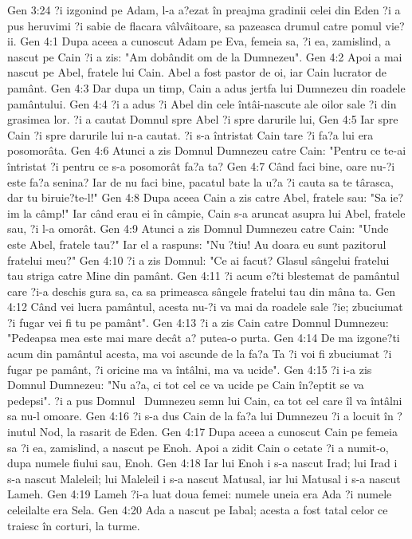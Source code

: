 Gen 3:24  ?i izgonind pe Adam, l-a a?ezat în preajma gradinii celei din Eden ?i a pus heruvimi ?i sabie de flacara vâlvâitoare, sa pazeasca drumul catre pomul vie?ii.
Gen 4:1  Dupa aceea a cunoscut Adam pe Eva, femeia sa, ?i ea, zamislind, a nascut pe Cain ?i a zis: "Am dobândit om de la Dumnezeu".
Gen 4:2  Apoi a mai nascut pe Abel, fratele lui Cain. Abel a fost pastor de oi, iar Cain lucrator de pamânt.
Gen 4:3  Dar dupa un timp, Cain a adus jertfa lui Dumnezeu din roadele pamântului.
Gen 4:4  ?i a adus ?i Abel din cele întâi-nascute ale oilor sale ?i din grasimea lor. ?i a cautat Domnul spre Abel ?i spre darurile lui,
Gen 4:5  Iar spre Cain ?i spre darurile lui n-a cautat. ?i s-a întristat Cain tare ?i fa?a lui era posomorâta.
Gen 4:6  Atunci a zis Domnul Dumnezeu catre Cain: "Pentru ce te-ai întristat ?i pentru ce s-a posomorât fa?a ta?
Gen 4:7  Când faci bine, oare nu-?i este fa?a senina? Iar de nu faci bine, pacatul bate la u?a ?i cauta sa te târasca, dar tu biruie?te-l!"
Gen 4:8  Dupa aceea Cain a zis catre Abel, fratele sau: "Sa ie?im la câmp!" Iar când erau ei în câmpie, Cain s-a aruncat asupra lui Abel, fratele sau, ?i l-a omorât.
Gen 4:9  Atunci a zis Domnul Dumnezeu catre Cain: "Unde este Abel, fratele tau?" Iar el a raspuns: "Nu ?tiu! Au doara eu sunt pazitorul fratelui meu?"
Gen 4:10  ?i a zis Domnul: "Ce ai facut? Glasul sângelui fratelui tau striga catre Mine din pamânt.
Gen 4:11  ?i acum e?ti blestemat de pamântul care ?i-a deschis gura sa, ca sa primeasca sângele fratelui tau din mâna ta.
Gen 4:12  Când vei lucra pamântul, acesta nu-?i va mai da roadele sale ?ie; zbuciumat ?i fugar vei fi tu pe pamânt".
Gen 4:13  ?i a zis Cain catre Domnul Dumnezeu: "Pedeapsa mea este mai mare decât a? putea-o purta.
Gen 4:14  De ma izgone?ti acum din pamântul acesta, ma voi ascunde de la fa?a Ta ?i voi fi zbuciumat ?i fugar pe pamânt, ?i oricine ma va întâlni, ma va ucide".
Gen 4:15  ?i i-a zis Domnul Dumnezeu: "Nu a?a, ci tot cel ce va ucide pe Cain în?eptit se va pedepsi". ?i a pus Domnul  Dumnezeu semn lui Cain, ca tot cel care îl va întâlni sa nu-l omoare.
Gen 4:16  ?i s-a dus Cain de la fa?a lui Dumnezeu ?i a locuit în ?inutul Nod, la rasarit de Eden.
Gen 4:17  Dupa aceea a cunoscut Cain pe femeia sa ?i ea, zamislind, a nascut pe Enoh. Apoi a zidit Cain o cetate ?i a numit-o, dupa numele fiului sau, Enoh.
Gen 4:18  Iar lui Enoh i s-a nascut Irad; lui Irad i s-a nascut Maleleil; lui Maleleil i s-a nascut Matusal, iar lui Matusal i s-a nascut Lameh.
Gen 4:19  Lameh ?i-a luat doua femei: numele uneia era Ada ?i numele celeilalte era Sela.
Gen 4:20  Ada a nascut pe Iabal; acesta a fost tatal celor ce traiesc în corturi, la turme.
